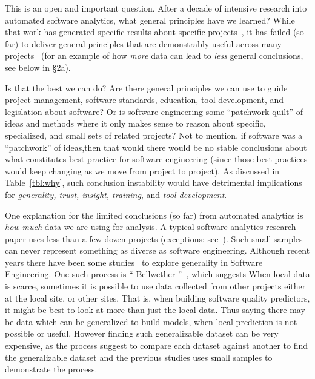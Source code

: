 \documentclass[sigconf]{acmart}
\theoremstyle{break}
\begin{document}
This is an open and important question. After a decade of intensive research into automated software analytics, what general principles have we learned? While that work has generated specific results about specific projects~\cite{Bird:2015,menzies2013software}, it has failed (so far) to deliver general principles that are demonstrably useful across many projects~\cite{menzies2013guest} (for an example of how {\em more} data can lead to {\em less} general conclusions, see below in {\S}2a).

Is that the best we can do? Are there general principles we can use to guide project management, software standards, education,   tool development, and legislation about software? 
Or is  software engineering some ``patchwork quilt'' of ideas and methods where it only makes sense to reason about specific, specialized, and small sets of related projects? Not to mention, if software was a ``patchwork'' of ideas,then that would  there would be no stable conclusions about what constitutes best practice for software engineering (since those best practices would keep changing as we move from project to project). As discussed in Table~\ref{tbl:why}, such conclusion instability would have detrimental implications for {\em generality, trust, insight, training}, and {\em tool development}.

One  explanation for the limited conclusions (so far) from automated analytics is  {\em how much} data we are using for analysis. A typical software analytics research paper uses less than a few dozen projects  (exceptions: see~\cite{krishna18a, zhao17, agrawal18}). Such small samples can never represent something as diverse as software engineering. Although recent years there have been some studies~\cite{krishna16a,krishna2017simpler,nair19a,mensah18z,mensah2017stratification,mensah2017investigating} to explore generality in Software Engineering. One such process is `` Bellwether ''~\cite{krishna16a,krishna2017simpler,nair19a}, which suggests When local data is scarce, sometimes it is possible to use data collected from other projects either at the local site, or other sites. That is, when building software quality predictors, it might be best to look at more than just the local data. Thus saying there may be data which can be generalized to build models, when local prediction is not possible or useful. However finding such generalizable dataset can be very expensive, as the process suggest to compare each dataset against another to find the generalizable dataset and the previous studies uses small samples to demonstrate the process. 
\end{document}
